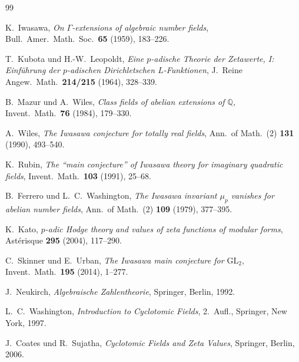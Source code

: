 \documentclass[12pt,a4paper]{amsart}
\theoremstyle{definition}
\newcommand{\Q}{\mathbb{Q}}
\begin{document}
\begin{thebibliography}{99}

K.~Iwasawa,
\textit{On $\Gamma$-extensions of algebraic number fields},
Bull.\ Amer.\ Math.\ Soc.\ \textbf{65} (1959), 183--226.

T.~Kubota und H.-W.~Leopoldt,
\textit{Eine $p$-adische Theorie der Zetawerte, I: Einführung der $p$-adischen Dirichletschen $L$-Funktionen},
J.\ Reine Angew.\ Math.\ \textbf{214/215} (1964), 328--339.

B.~Mazur und A.~Wiles,
\textit{Class fields of abelian extensions of $\Q$},
Invent.\ Math.\ \textbf{76} (1984), 179--330.

A.~Wiles,
\textit{The Iwasawa conjecture for totally real fields},
Ann.\ of Math.\ (2) \textbf{131} (1990), 493--540.

K.~Rubin,
\textit{The ``main conjecture'' of Iwasawa theory for imaginary quadratic fields},
Invent.\ Math.\ \textbf{103} (1991), 25--68.

B.~Ferrero und L.~C.~Washington,
\textit{The Iwasawa invariant $\mu_p$ vanishes for abelian number fields},
Ann.\ of Math.\ (2) \textbf{109} (1979), 377--395.

K.~Kato,
\textit{$p$-adic Hodge theory and values of zeta functions of modular forms},
Ast\'erisque \textbf{295} (2004), 117--290.

C.~Skinner und E.~Urban,
\textit{The Iwasawa main conjecture for $\mathrm{GL}_2$},
Invent.\ Math.\ \textbf{195} (2014), 1--277.

J.~Neukirch,
\textit{Algebraische Zahlentheorie},
Springer, Berlin, 1992.

L.~C.~Washington,
\textit{Introduction to Cyclotomic Fields},
2.\ Aufl., Springer, New York, 1997.

J.~Coates und R.~Sujatha,
\textit{Cyclotomic Fields and Zeta Values},
Springer, Berlin, 2006.

\end{thebibliography}
\end{document}
